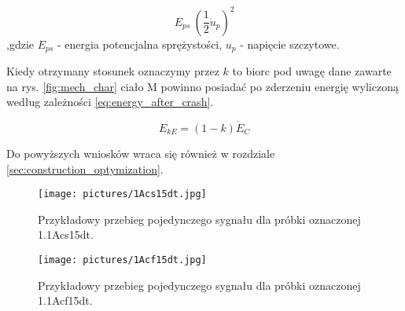   
\begin{equation}[h]
E_{ps} ~ (\frac{1}{2} \dot u_{p})^2
\label{eq:energy_prop}
\end{equation}
,gdzie $E_{ps}$ - energia potencjalna sprężystości, $u_{p}$ - napięcie szczytowe.

\indent Kiedy otrzymany stosunek oznaczymy przez $k$ to biorc pod uwagę dane zawarte na
rys. \ref{fig:mech_char} ciało M powinno posiadać po zderzeniu energię wyliczoną według
zależności \ref{eq:energy_after_crash}.


\begin{equation}
E_{kE} = (1-k)\dot E_C
\label{eq:energy_after_crash}
\end{equation}

\indent Do powyższych wniosków wraca się również w rozdziale \ref{sec:construction_optymization}.

\begin{figure}[tbph]
\centering
\texttt{[image: pictures/1Acs15dt.jpg]}
\caption{Przykładowy przebieg pojedynczego sygnału dla próbki oznaczonej 1.1Acs15dt.}
\label{fig:scope_without_silencer}
\end{figure}

\begin{figure}[tbph]
\centering
\texttt{[image: pictures/1Acf15dt.jpg]}
\caption{Przykładowy przebieg pojedynczego sygnału dla próbki oznaczonej 1.1Acf15dt.}
\label{fig:scope_with_silencer}
\end{figure}
